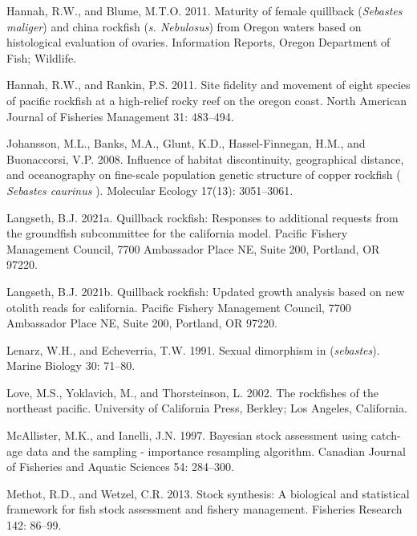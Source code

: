 \documentclass[11pt,
  english,
  letterpaper,
]{article}
\begin{document}
\leavevmode\hypertarget{ref-HannahandBlume_maturity_2011}{}%
Hannah, R.W., and Blume, M.T.O. 2011. Maturity of female quillback (\emph{Sebastes maliger}) and china rockfish (\emph{s. Nebulosus}) from Oregon waters based on histological evaluation of ovaries. Information Reports, Oregon Department of Fish; Wildlife.

\leavevmode\hypertarget{ref-HannahandRankin_rockfish_site_fidelity_2011}{}%
Hannah, R.W., and Rankin, P.S. 2011. Site fidelity and movement of eight species of pacific rockfish at a high-relief rocky reef on the oregon coast. North American Journal of Fisheries Management 31: 483--494.

\leavevmode\hypertarget{ref-johansson_influence_2008}{}%
Johansson, M.L., Banks, M.A., Glunt, K.D., Hassel-Finnegan, H.M., and Buonaccorsi, V.P. 2008. Influence of habitat discontinuity, geographical distance, and oceanography on fine-scale population genetic structure of copper rockfish ( \emph{Sebastes caurinus} ). Molecular Ecology 17(13): 3051--3061.

\leavevmode\hypertarget{ref-Langseth_augrequests_2021}{}%
Langseth, B.J. 2021a. Quillback rockfish: Responses to additional requests from the groundfish subcommittee for the california model. Pacific Fishery Management Council, 7700 Ambassador Place NE, Suite 200, Portland, OR 97220.

\leavevmode\hypertarget{ref-Langseth_mopupgrowth_2021}{}%
Langseth, B.J. 2021b. Quillback rockfish: Updated growth analysis based on new otolith reads for california. Pacific Fishery Management Council, 7700 Ambassador Place NE, Suite 200, Portland, OR 97220.

\leavevmode\hypertarget{ref-LenarzandEcheverria_dimorphism_1991}{}%
Lenarz, W.H., and Echeverria, T.W. 1991. Sexual dimorphism in (\emph{sebastes}). Marine Biology 30: 71--80.

\leavevmode\hypertarget{ref-loveetal_2002}{}%
Love, M.S., Yoklavich, M., and Thorsteinson, L. 2002. The rockfishes of the northeast pacific. University of California Press, Berkley; Los Angeles, California.

\leavevmode\hypertarget{ref-mcallister_bayesian_1997}{}%
McAllister, M.K., and Ianelli, J.N. 1997. Bayesian stock assessment using catch-age data and the sampling - importance resampling algorithm. Canadian Journal of Fisheries and Aquatic Sciences 54: 284--300.

\leavevmode\hypertarget{ref-methot_stock_2013}{}%
Methot, R.D., and Wetzel, C.R. 2013. Stock synthesis: A biological and statistical framework for fish stock assessment and fishery management. Fisheries Research 142: 86--99.
\end{document}
